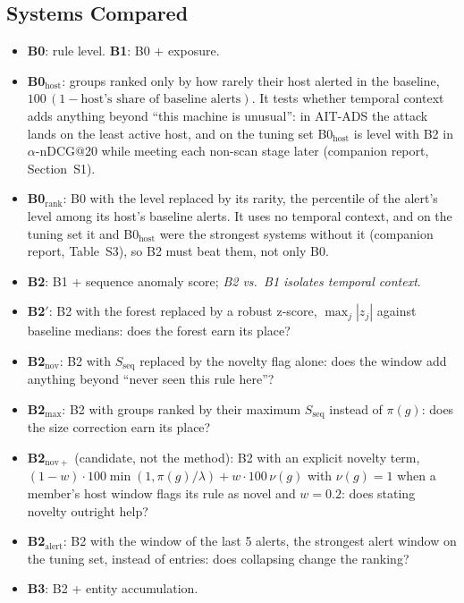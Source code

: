 \documentclass[conference]{IEEEtran}
\begin{document}
\subsection{Systems Compared}

\begin{itemize}
\item \textbf{B0}: rule level. \textbf{B1}: B0 + exposure.
\item \textbf{B0$_\mathrm{host}$}: groups ranked only by how rarely their host alerted in the baseline, $100\,(1 - \text{host's share of baseline alerts})$. It tests whether temporal context adds anything beyond ``this machine is unusual'': in AIT-ADS the attack lands on the least active host, and on the tuning set B0$_\mathrm{host}$ is level with B2 in $\alpha$-nDCG@20 while meeting each non-scan stage later (companion report, Section~S1).
\item \textbf{B0$_\mathrm{rank}$}: B0 with the level replaced by its rarity, the percentile of the alert's level among its host's baseline alerts. It uses no temporal context, and on the tuning set it and B0$_\mathrm{host}$ were the strongest systems without it (companion report, Table~S3), so B2 must beat them, not only B0.
\item \textbf{B2}: B1 + sequence anomaly score; \emph{B2 vs.\ B1 isolates temporal context}.
\item \textbf{B2$'$}: B2 with the forest replaced by a robust z-score, $\max_j |z_j|$ against baseline medians: does the forest earn its place?
\item \textbf{B2$_\mathrm{nov}$}: B2 with $S_\mathrm{seq}$ replaced by the novelty flag alone: does the window add anything beyond ``never seen this rule here''?
\item \textbf{B2$_\mathrm{max}$}: B2 with groups ranked by their maximum $S_\mathrm{seq}$ instead of $\pi(g)$: does the size correction earn its place?
\item \textbf{B2$_\mathrm{nov+}$} (candidate, not the method): B2 with an explicit novelty term, $(1-w)\cdot 100\min(1,\pi(g)/\lambda) + w \cdot 100\,\nu(g)$ with $\nu(g) = 1$ when a member's host window flags its rule as novel and $w = 0.2$: does stating novelty outright help?
\item \textbf{B2$_\mathrm{alert}$}: B2 with the window of the last 5 alerts, the strongest alert window on the tuning set, instead of entries: does collapsing change the ranking?
\item \textbf{B3}: B2 + entity accumulation.
\end{itemize}
\end{document}
